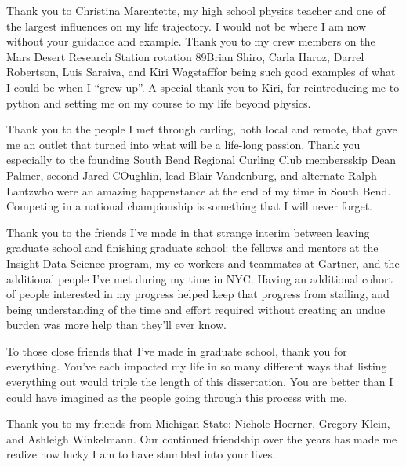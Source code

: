 \begin{acknowledge}
Thank you to Christina Marentette, my high school physics teacher and
one of the largest influences on my life trajectory. I would not be
where I am now without your guidance and example. Thank you to my crew
members on the Mars Desert Research Station rotation
89\textemdash{}Brian Shiro, Carla Haroz, Darrel Robertson, Luis Saraiva,
and Kiri Wagstaff\textemdash{}for being such good examples of what I
could be when I ``grew up''. A special thank you to Kiri, for
reintroducing me to python and setting me on my course to my life beyond
physics.

Thank you to the people I met through curling, both local and remote,
that gave me an outlet that turned into what will be a life-long
passion. Thank you especially to the founding South Bend Regional
Curling Club members\textemdash{}skip Dean Palmer, second Jared
COughlin, lead Blair Vandenburg, and alternate Ralph
Lantz\textemdash{}who were an amazing happenstance at the end of my time
in South Bend. Competing in a national championship is something that I
will never forget.

Thank you to the friends I've made in that strange interim between
leaving graduate school and finishing graduate school: the fellows and
mentors at the Insight Data Science program, my co-workers and teammates
at Gartner, and the additional people I've met during my time in NYC.
Having an additional cohort of people interested in my progress helped
keep that progress from stalling, and being understanding of the time
and effort required without creating an undue burden was more help than
they'll ever know.

To those close friends that I've made in graduate school, thank you for
everything. You've each impacted my life in so many different ways that
listing everything out would triple the length of this dissertation. You
are better than I could have imagined as the people going through this
process with me.

Thank you to my friends from Michigan State: Nichole Hoerner, Gregory
Klein, and Ashleigh Winkelmann. Our continued friendship over the years
has made me realize how lucky I am to have stumbled into your lives.


\end{acknowledge}
